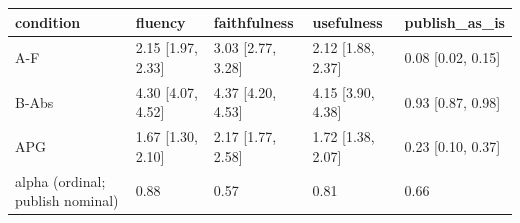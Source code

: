 \begin{tabular}{lllll}
\toprule
condition & fluency & faithfulness & usefulness & publish\_as\_is \\
\midrule
A-F & 2.15 [1.97, 2.33] & 3.03 [2.77, 3.28] & 2.12 [1.88, 2.37] & 0.08 [0.02, 0.15] \\
B-Abs & 4.30 [4.07, 4.52] & 4.37 [4.20, 4.53] & 4.15 [3.90, 4.38] & 0.93 [0.87, 0.98] \\
APG & 1.67 [1.30, 2.10] & 2.17 [1.77, 2.58] & 1.72 [1.38, 2.07] & 0.23 [0.10, 0.37] \\
alpha (ordinal; publish nominal) & 0.88 & 0.57 & 0.81 & 0.66 \\
\bottomrule
\end{tabular}
